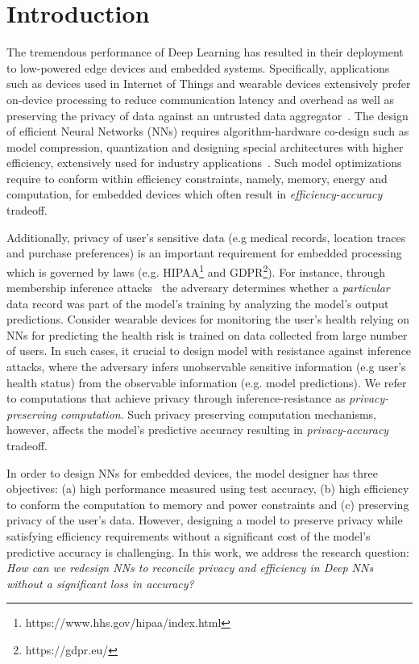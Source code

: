 \section{Introduction}\label{introduction}

The tremendous performance of Deep Learning has resulted in their deployment to low-powered edge devices and embedded systems.
Specifically, applications such as devices used in Internet of Things and wearable devices extensively prefer on-device processing to reduce communication latency and overhead as well as preserving the privacy of data against an untrusted data aggregator~\cite{8110880}.
The design of efficient Neural Networks (NNs) requires algorithm-hardware co-design such as model compression, quantization and designing special architectures with higher efficiency, extensively used for industry applications~\cite{8114708}.
Such model optimizations require to conform within efficiency constraints, namely, memory, energy and computation, for embedded devices which often result in \textit{efficiency-accuracy} tradeoff.

Additionally, privacy of user's sensitive data (e.g medical records, location traces and purchase preferences) is an important requirement for embedded processing which is governed by laws (e.g. HIPAA\footnote{https://www.hhs.gov/hipaa/index.html} and GDPR\footnote{https://gdpr.eu/}).
For instance, through membership inference attacks~\cite{shokri2017membership} the adversary determines whether a \textit{particular} data record was part of the model's training by analyzing the model's output predictions.
Consider wearable devices for monitoring the user's health relying on NNs for predicting the health risk is trained on data collected from large number of users.
In such cases, it crucial to design model with resistance against inference attacks, where the adversary infers unobservable sensitive information (e.g user's health status) from the observable information (e.g. model predictions).
We refer to computations that achieve privacy through inference-resistance as {\em privacy-preserving computation}.
Such privacy preserving computation mechanisms, however, affects the model's predictive accuracy resulting in \textit{privacy-accuracy} tradeoff.

In order to design NNs for embedded devices, the model designer has three objectives: (a) high performance measured using test accuracy, (b) high efficiency to conform the computation to memory and power constraints and (c) preserving privacy of the user's data.
However, designing a model to preserve privacy while satisfying efficiency requirements without a significant cost of the model's predictive accuracy is challenging.
In this work, we address the research question: \textit{How can we redesign NNs to reconcile privacy and efficiency in Deep NNs without a significant loss in accuracy?}

